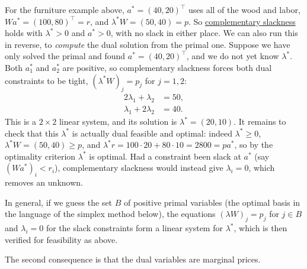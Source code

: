	\begin{example}
	  \label{ex:complementary-slackness-for-furniture-no-slack}
		For the furniture example above, $a^\ast = (40, 20)^\top$ uses all of the wood and labor, $Wa^\ast = (100, 80)^\top = r$, and $\lambda^\ast W = (50, 40) = p$. So \hyperref[thm:complementary-slackness]{complementary slackness} holds with $\lambda^\ast > 0$ and $a^\ast > 0$, with no slack in either place. We can also run this in reverse, to \textit{compute} the dual solution from the primal one. Suppose we have only solved the primal and found $a^\ast = (40, 20)^\top$, and we do not yet know $\lambda^\ast$. Both $a_1^\ast$ and $a_2^\ast$ are positive, so complementary slackness forces both dual constraints to be tight, $(\lambda^\ast W)_j = p_j$ for $j = 1, 2$:
		\begin{align}
			2\lambda_1 + \lambda_2 &= 50, \\
			\lambda_1 + 2\lambda_2 &= 40.
		\end{align}
		This is a $2 \times 2$ linear system, and its solution is $\lambda^\ast = (20, 10)$. It remains to check that this $\lambda^\ast$ is actually dual feasible and optimal: indeed $\lambda^\ast \geq 0$, $\lambda^\ast W = (50, 40) \geq p$, and $\lambda^\ast r = 100 \cdot 20 + 80 \cdot 10 = 2800 = pa^\ast$, so by the optimality criterion $\lambda^\ast$ is optimal. Had a constraint been slack at $a^\ast$ (say $(Wa^\ast)_i < r_i$), complementary slackness would instead give $\lambda_i = 0$, which removes an unknown.
	\end{example}

	In general, if we guess the set $B$ of positive primal variables (the optimal basis in the language of the simplex method below), the equations $(\lambda W)_j = p_j$ for $j \in B$ and $\lambda_i = 0$ for the slack constraints form a linear system for $\lambda^\ast$, which is then verified for feasibility as above.

	The second consequence is that the dual variables are marginal prices. 

